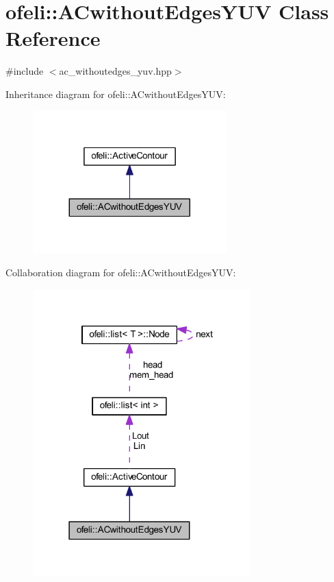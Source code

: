 \hypertarget{classofeli_1_1_a_cwithout_edges_y_u_v}{\section{ofeli\-:\-:A\-Cwithout\-Edges\-Y\-U\-V Class Reference}
\label{classofeli_1_1_a_cwithout_edges_y_u_v}
}


{\ttfamily \#include $<$ac\-\_\-withoutedges\-\_\-yuv.\-hpp$>$}



Inheritance diagram for ofeli\-:\-:A\-Cwithout\-Edges\-Y\-U\-V\-:\nopagebreak
\begin{figure}[H]
\begin{center}
\leavevmode
\includegraphics[width=212pt]{classofeli_1_1_a_cwithout_edges_y_u_v__inherit__graph}
\end{center}
\end{figure}


Collaboration diagram for ofeli\-:\-:A\-Cwithout\-Edges\-Y\-U\-V\-:\nopagebreak
\begin{figure}[H]
\begin{center}
\leavevmode
\includegraphics[width=238pt]{classofeli_1_1_a_cwithout_edges_y_u_v__coll__graph}
\end{center}
\end{figure}
